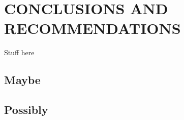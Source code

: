 %
%  
%

\chapter{CONCLUSIONS AND RECOMMENDATIONS}

Stuff here

\section{Maybe}

\section{Possibly}
